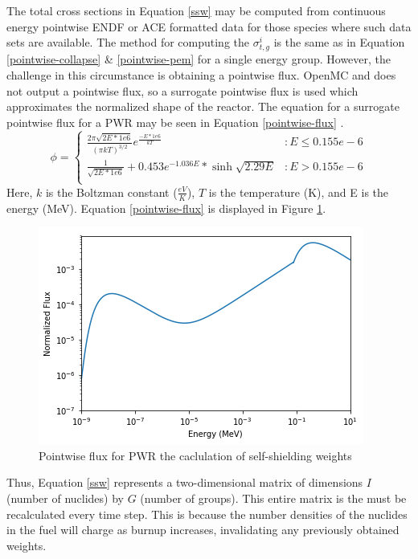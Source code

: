 \documentclass{article}
\begin{document}
The total cross sections in Equation \ref{ssw} may be computed from continuous energy
pointwise ENDF or ACE formatted data for those species where such data sets are available.
The method for computing the  $\sigma_{t,g}^i$ is the same as in Equation
\ref{pointwise-collapse} \& \ref{pointwise-pem} for a single energy group.  However,
the challenge in this circumstance is obtaining a pointwise flux. OpenMC and does not output
a pointwise flux, so a surrogate pointwise flux is used which approximates the normalized shape
of the reactor. The equation for a surrogate pointwise flux for a PWR may be seen in
Equation \ref{pointwise-flux} \cite{spectrum}.
\begin{equation}
\label{pointwise-flux}
\phi =
\begin{cases}
    \frac{2\pi\sqrt{2E*1e6}}{(\pi kT)^{3/2}}e^{\frac{-E*1e6}{kT}} & : E\leq 0.155e-6 \\
    \frac{1}{\sqrt{2E*1e6}} + 0.453e^{-1.036E}*\sinh{\sqrt{2.29E}} & : E > 0.155e-6 \\
\end{cases}
\end{equation}
Here, $k$ is the Boltzman constant ($\frac{eV}{K}$), $T$ is the temperature (K),
and E is the energy (MeV). Equation \ref{pointwise-flux} is displayed in
Figure \ref{fig:therm}.
\begin{figure}[h]
  \center
  \includegraphics[scale=0.6]{thermspec.png}
  \caption{Pointwise flux for PWR the caclulation of self-shielding weights}
  \label{fig:therm}
\end{figure}

Thus, Equation \ref{ssw} represents a two-dimensional matrix of dimensions
$I$ (number of nuclides) by $G$ (number of groups). This entire matrix is the
must be recalculated every time step. This is because the number densities of the nuclides
in the fuel will charge as burnup increases, invalidating any previously obtained weights.
\end{document}
